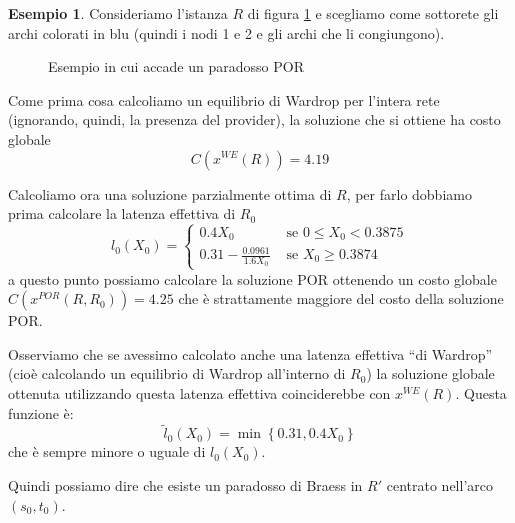 \documentclass[a4paper]{article}
\theoremstyle{plain}
\theoremstyle{definition}
\newtheorem{myes}[myteo]{Esempio}
\theoremstyle{remark}
\newcommand{\set}[1]{\left\{#1\right\}}
\newcommand{\pa}[1]{\left(#1\right)}
\begin{document}
\begin{myes}
  Consideriamo l'istanza $R$ di figura \ref{fig:paradosso-por} e
  scegliamo come sottorete gli archi colorati in blu (quindi i nodi 1
  e 2 e gli archi che li congiungono).

  \begin{figure}[ht]
    \centering
    \caption{Esempio in cui accade un paradosso POR}
    \label{fig:paradosso-por}
  \end{figure}

  Come prima cosa calcoliamo un equilibrio di Wardrop per l'intera
  rete (ignorando, quindi, la presenza del provider), la soluzione che
  si ottiene ha costo globale
  \[ C\pa{x^{WE}\pa{R}} = 4.19 \]
  
  Calcoliamo ora una soluzione parzialmente ottima di $R$, per farlo
  dobbiamo prima calcolare la latenza effettiva di $R_0$
  \[ l_0\pa{X_0} = \left\{
      \begin{matrix}
        0.4 X_0 & \text{ se } 0 \le X_0 < 0.3875 \\
        0.31 - \frac{0.0961}{1.6X_0} & \text{ se } X_0 \ge 0.3874
      \end{matrix} \right.
  \]
  a questo punto possiamo calcolare la soluzione POR ottenendo un
  costo globale $C\pa{x^{POR}\pa{R,R_0}} = 4.25$ che è strattamente
  maggiore del costo della soluzione POR.

  Osserviamo che se avessimo calcolato anche una latenza effettiva
  ``di Wardrop'' (cioè calcolando un equilibrio di Wardrop all'interno
  di $R_0$) la soluzione globale ottenuta utilizzando questa latenza
  effettiva coinciderebbe con $x^{WE}\pa{R}$. Questa funzione è:
  \[ \tilde l _0 \pa{X_0} = \min\set{0.31, 0.4X_0} \]
  che è sempre minore o uguale di $l_0\pa{X_0}$.

  Quindi possiamo dire che esiste un paradosso di Braess in $R'$
  centrato nell'arco $\pa{s_0,t_0}$.
\end{myes}
\end{document}
